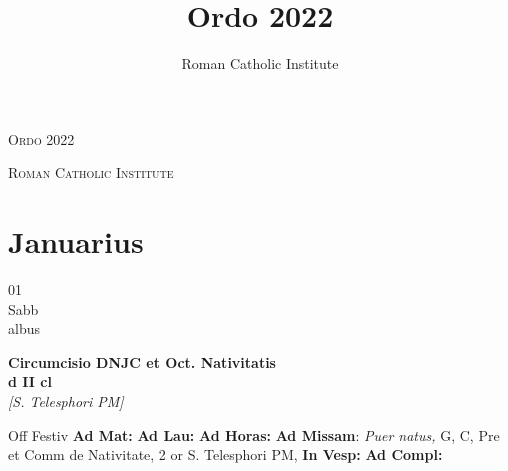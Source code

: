\documentclass[10pt, openany]{book}
\title{Ordo 2022}
\author{Roman Catholic Institute}
\begin{document}
        \begin{titlepage}
            \begin{center}
                {\fontsize{50}{60}\selectfont \textsc{Ordo 2022}}
            \end{center}
            \begin{center}
                {\footnotesize \textsc{Roman Catholic Institute}}
            \end{center}
        \end{titlepage}
        \clearpage\begingroup\pagestyle{empty}\cleardoublepage\endgroup
    
        \chapter{Januarius}
                        
        \begin{center}
            \begin{minipage}{3.5in}
                \vspace{2em}
                \begin{minipage}{0.5in}
                    {\Huge 01} \\
                    {\normalsize Sabb} \\
                    {\normalsize albus}
                \end{minipage}
                \begin{minipage}{3.0in}
                    \textbf{ \large Circumcisio DNJC et Oct. Nativitatis \\
                    \textnormal{\normalsize d II cl}} \\ \textit{[S. Telesphori PM]} \\ 
                \end{minipage}
                \begin{justify}Off Festiv
                    \textbf{Ad Mat: }
                    \textbf{Ad Lau: }
                    \textbf{Ad Horas: }\textbf{Ad Missam}: \textit{Puer natus,} G, C, Pre et Comm de Nativitate, 2 or S. Telesphori PM,  
                    \textbf{In Vesp: }
                    \textbf{Ad Compl: }
                \end{justify}
            \end{minipage}
        \end{center}
    
\end{document}
